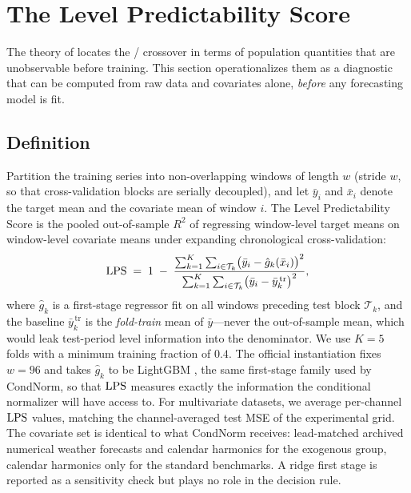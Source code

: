 \section{The Level Predictability Score}\label{sec:lps}

The theory of  locates the \inm/\cnm{} crossover in terms of population quantities that are unobservable before training. This section operationalizes them as a diagnostic that can be computed from raw data and covariates alone, \emph{before} any forecasting model is fit.

\subsection{Definition}

Partition the training series into non-overlapping windows of length $w$ (stride $w$, so that cross-validation blocks are serially decoupled), and let $\bar{y}_i$ and $\bar{x}_i$ denote the target mean and the covariate mean of window $i$. The Level Predictability Score is the pooled out-of-sample $R^2$ of regressing window-level target means on window-level covariate means under expanding chronological cross-validation:
\begin{equation}\label{eq:lpsdef}
\mathrm{LPS} \;=\; 1 \;-\; \frac{\sum_{k=1}^{K}\sum_{i\in\mathcal{T}_k}\bigl(\bar{y}_i - \hat{g}_k(\bar{x}_i)\bigr)^2}{\sum_{k=1}^{K}\sum_{i\in\mathcal{T}_k}\bigl(\bar{y}_i - \bar{y}^{\,\mathrm{tr}}_{k}\bigr)^2},
\end{equation}
where $\hat{g}_k$ is a first-stage regressor fit on all windows preceding test block $\mathcal{T}_k$, and the baseline $\bar{y}^{\,\mathrm{tr}}_{k}$ is the \emph{fold-train} mean of $\bar{y}$---never the out-of-sample mean, which would leak test-period level information into the denominator. We use $K=5$ folds with a minimum training fraction of $0.4$. The official instantiation fixes $w=96$ and takes $\hat{g}_k$ to be LightGBM \citep{ke2017lightgbm}, the same first-stage family used by CondNorm, so that $\mathrm{LPS}$ measures exactly the information the conditional normalizer will have access to. For multivariate datasets, we average per-channel $\mathrm{LPS}$ values, matching the channel-averaged test MSE of the experimental grid. The covariate set is identical to what CondNorm receives: lead-matched archived numerical weather forecasts and calendar harmonics for the exogenous group, calendar harmonics only for the standard benchmarks. A ridge first stage is reported as a sensitivity check but plays no role in the decision rule.

